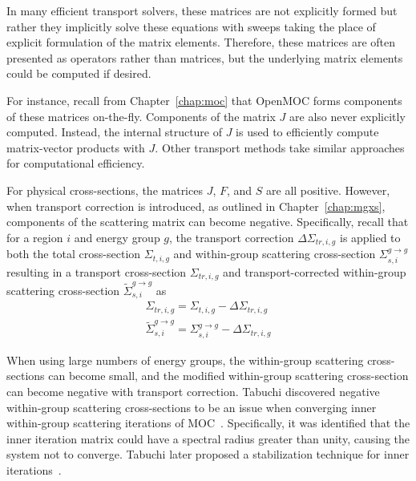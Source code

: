 In many efficient transport solvers, these matrices are not explicitly formed but rather they implicitly solve these equations with sweeps taking the place of explicit formulation of the matrix elements. Therefore, these matrices are often presented as operators rather than matrices, but the underlying matrix elements could be computed if desired. 

For instance, recall from Chapter~\ref{chap:moc} that OpenMOC forms components of these matrices on-the-fly. Components of the matrix $J$ are also never explicitly computed. Instead, the internal structure of $J$ is used to efficiently compute matrix-vector products with $J$. Other transport methods take similar approaches for computational efficiency.

For physical cross-sections, the matrices $J$, $F$, and $S$ are all positive. However, when transport correction is introduced, as outlined in Chapter~\ref{chap:mgxs}, components of the scattering matrix can become negative. Specifically, recall that for a region $i$ and energy group $g$, the transport correction $\Delta \Sigma_{\textit{tr}, i, g}$ is applied to both the total cross-section $\Sigma_{t, i, g}$ and within-group scattering cross-section $\Sigma_{s, i}^{g \rightarrow g}$ resulting in a transport cross-section $\Sigma_{\textit{tr}, i, g}$ and transport-corrected within-group scattering cross-section $\tilde{\Sigma}_{s, i}^{g \rightarrow g}$ as
\begin{equation}
\begin{split}
\Sigma_{\textit{tr}, i, g} = \Sigma_{t, i, g} -  \Delta \Sigma_{\textit{tr}, i, g} \\
\tilde{\Sigma}_{s, i}^{g \rightarrow g} = \Sigma_{s, i}^{g \rightarrow g} -  \Delta \Sigma_{\textit{tr}, i, g}
\end{split}
\label{eq:total-xs}
\end{equation}

When using large numbers of energy groups, the within-group scattering cross-sections can become small, and the modified within-group scattering cross-section can become negative with transport correction. Tabuchi discovered negative within-group scattering cross-sections to be an issue when converging inner within-group scattering iterations of \ac{MOC}~\cite{ty-problem}. Specifically, it was identified that the inner iteration matrix could have a spectral radius greater than unity, causing the system not to converge. Tabuchi later proposed a stabilization technique for inner iterations~\cite{ty-solution}.


